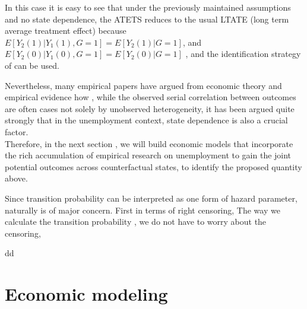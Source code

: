 \documentclass{article}
\begin{document}
In this case it is easy to see that under the previously maintained assumptions and no state dependence, the ATETS reduces to the usual LTATE (long term average treatment effect) because $E[ Y_2(1) | Y_1(1), G=1 ] = E[ Y_2(1) | G=1] $, and $ E[Y_2(0) | Y_1(0) , G=1] =  E[Y_2(0) |  G=1]$   , and the identification strategy of \cite{athey2020combining} can be used. 



Nevertheless, many empirical papers\cite{heckman1981heterogeneity,heckman1984method, torgovitsky2019nonparametric} have argued from economic theory and empirical evidence how , while the observed serial correlation between outcomes are often cases not solely by unobserved heterogeneity, it has been argued quite strongly that in the unemployment context, state dependence is also a crucial factor. 
\\ Therefore, in the next section , we will build economic models that incorporate the rich accumulation of empirical research on unemployment  to gain the joint potential outcomes across counterfactual states, to identify the proposed quantity above.



\koko

\begin{remark}
\koko 
Since transition probability can be interpreted as one form of hazard parameter, naturally is of major concern. First in terms of right censoring, 
The way we calculate the transition probability , we do not have to worry about the censoring, 
\end{remark}
\begin{theorem}
dd
\end{theorem}


\section{Economic modeling}
\end{document}
